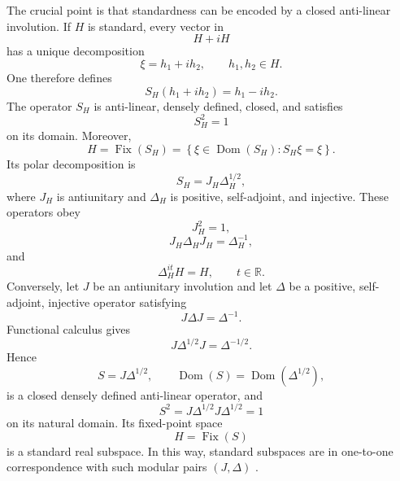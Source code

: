 \documentclass[a4paper,11pt]{article}
\theoremstyle{definition}
\newcommand{\Dom}{\operatorname{Dom}}
\begin{document}
The crucial point is that standardness can be encoded by a closed anti-linear
involution.  If $H$ is standard, every vector in
\begin{equation}
    H+iH
\end{equation}
has a unique decomposition
\begin{equation}
    \xi=h_1+ih_2,
    \qquad
    h_1,h_2\in H.
\end{equation}
One therefore defines
\begin{equation}
    S_H(h_1+ih_2)
    =
    h_1-ih_2.
    \label{eq:ssgq:TomitaDefinition}
\end{equation}
The operator $S_H$ is anti-linear, densely defined, closed, and satisfies
\begin{equation}
    S_H^2=1
\end{equation}
on its domain.  Moreover,
\begin{equation}
    H
    =
    \operatorname{Fix}(S_H)
    =
    \left\{
    \xi\in\Dom(S_H):
    S_H\xi=\xi
    \right\}.
    \label{eq:ssgq:FixS}
\end{equation}
Its polar decomposition is
\begin{equation}
    S_H
    =
    J_H\Delta_H^{1/2},
    \label{eq:ssgq:TomitaPolar}
\end{equation}
where $J_H$ is antiunitary and $\Delta_H$ is positive, self-adjoint, and
injective.  These operators obey
\begin{equation}
    J_H^2=1,
\end{equation}
\begin{equation}
    J_H\Delta_HJ_H
    =
    \Delta_H^{-1},
    \label{eq:ssgq:JDelta}
\end{equation}
and
\begin{equation}
    \Delta_H^{it}H=H,
    \qquad
    t\in\mathbb R.
\end{equation}
Conversely, let $J$ be an antiunitary involution and let $\Delta$ be a
positive, self-adjoint, injective operator satisfying
\begin{equation}
    J\Delta J
    =
    \Delta^{-1}.
    \label{eq:ssgq:modularpair}
\end{equation}
Functional calculus gives
\begin{equation}
    J\Delta^{1/2}J
    =
    \Delta^{-1/2}.
\end{equation}
Hence
\begin{equation}
    S
    =
    J\Delta^{1/2},
    \qquad
    \Dom(S)=\Dom(\Delta^{1/2}),
    \label{eq:ssgq:SfromJD}
\end{equation}
is a closed densely defined anti-linear operator, and
\begin{equation}
    S^2
    =
    J\Delta^{1/2}J\Delta^{1/2}
    =
    1
\end{equation}
on its natural domain.  Its fixed-point space
\begin{equation}
    H
    =
    \operatorname{Fix}(S)
\end{equation}
is a standard real subspace.  In this way, standard subspaces are in
one-to-one correspondence with such modular pairs $(J,\Delta)$
\cite{Longo2008,BrunettiGuidoLongo2002}.
\end{document}

